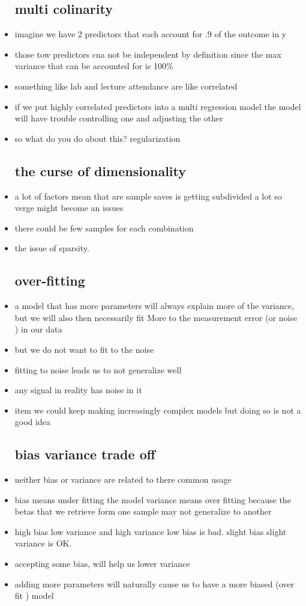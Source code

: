 \documentclass{article}
\begin{document}
\begin{itemize}
\subsection{multi colinarity}
    \item imagine we have 2 predictors that each account for $.9$ of the outcome in y
    \item those tow predictors cna not be independent by definition since the max variance that can be accounted for is 100\%
    \item something like lab and lecture attendance are like correlated 
    \item if we put highly correlated predictors into a multi regression model the model will have trouble controlling one and adjusting the other 
    \item so what do you do about this? regularization 
    \subsection{the curse of dimensionality}
    \item a lot of factors mean that are sample saves is getting subdivided a lot so verge might become an issues
    \item there could be few samples for each combination 
    \item the issue of sparsity. 
    \subsection{over-fitting }
    \item a model that has more parameters will always explain more of the variance, but we will also then necessarily fit More to the measurement error (or noise ) in our data
    \item but we do not want to fit to the noise
    \item fitting to noise leads us to not generalize well
    \item any signal in reality has noise in it 
    \item item we could keep making increasingly complex models but doing so is not a good idea
    \subsection{bias variance trade off}
    \item neither bias or variance are related to there common usage
    \item bias means under fitting the model 
    \itme variance means over fitting because the betas that we retrieve form one sample may not generalize to another 
    \item high bias low variance and high variance low bias is bad. slight bias slight variance is OK. 
    \item accepting some bias, will help us lower variance 
    \item adding more parameters will naturally cause us to have a more biased (over fit ) model

\end{itemize}
\end{document}
